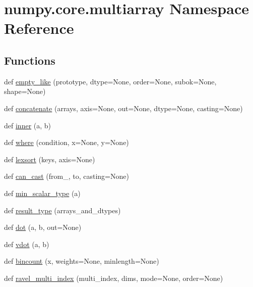 \hypertarget{namespacenumpy_1_1core_1_1multiarray}{}\section{numpy.\+core.\+multiarray Namespace Reference}
\label{namespacenumpy_1_1core_1_1multiarray}
\subsection*{Functions}
\begin{DoxyCompactItemize}
\item 
def \hyperlink{namespacenumpy_1_1core_1_1multiarray_aa079a8a2542e7960d6f2b334ada7e93e}{empty\+\_\+like} (prototype, dtype=None, order=None, subok=None, shape=None)
\item 
def \hyperlink{namespacenumpy_1_1core_1_1multiarray_a34b85e05b7f083d1f8ffbb5c3ee700cf}{concatenate} (arrays, axis=None, out=None, dtype=None, casting=None)
\item 
def \hyperlink{namespacenumpy_1_1core_1_1multiarray_a87e95f0f4d5d73db08caf30ba5207e24}{inner} (a, b)
\item 
def \hyperlink{namespacenumpy_1_1core_1_1multiarray_a8ce110e08e21273e014fdd160d5a14f3}{where} (condition, x=None, y=None)
\item 
def \hyperlink{namespacenumpy_1_1core_1_1multiarray_abfde7e15583dd7dc27427359107e9db9}{lexsort} (keys, axis=None)
\item 
def \hyperlink{namespacenumpy_1_1core_1_1multiarray_a01e06910ded7e94fc6e385ef96e8d0a1}{can\+\_\+cast} (from\+\_\+, to, casting=None)
\item 
def \hyperlink{namespacenumpy_1_1core_1_1multiarray_a71e0e2690ab43de1a49302bbdd24c0ca}{min\+\_\+scalar\+\_\+type} (a)
\item 
def \hyperlink{namespacenumpy_1_1core_1_1multiarray_a8bb7393227c0206063d74e1b68491262}{result\+\_\+type} (arrays\+\_\+and\+\_\+dtypes)
\item 
def \hyperlink{namespacenumpy_1_1core_1_1multiarray_a3871b8ad563a92410dda0531e685428d}{dot} (a, b, out=None)
\item 
def \hyperlink{namespacenumpy_1_1core_1_1multiarray_ad7fcdff2015b8369807bbde3b5a10784}{vdot} (a, b)
\item 
def \hyperlink{namespacenumpy_1_1core_1_1multiarray_ac4f1337a7091b3c476fa64b4471825cd}{bincount} (x, weights=None, minlength=None)
\item 
def \hyperlink{namespacenumpy_1_1core_1_1multiarray_a71190a48e8a753b72e80bed3b822613d}{ravel\+\_\+multi\+\_\+index} (multi\+\_\+index, dims, mode=None, order=None)

\end{DoxyCompactItemize}
